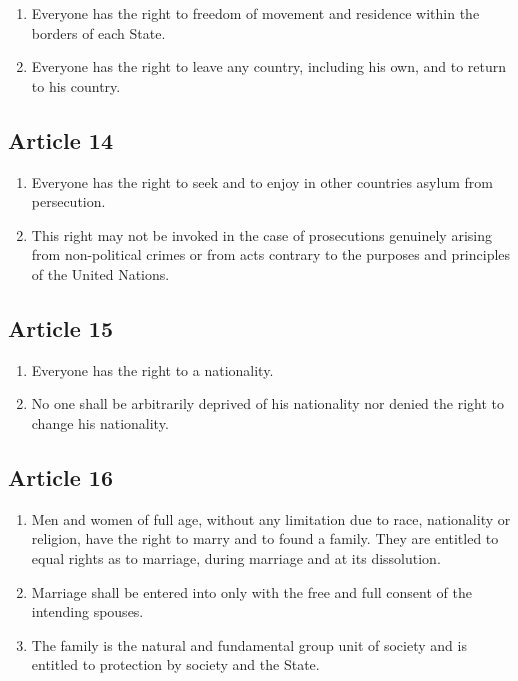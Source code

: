 \documentclass[
  ngerman,
  american,
  titlepage,
  openright,
  DIV=calc,
  toc=listof,
  listof=nochaptergap]{scrbook}
\begin{document}
\begin{enumerate}
\def\labelenumi{\arabic{enumi}.}
\item
  Everyone has the right to freedom of movement and residence within the
  borders of each State.
\item
  Everyone has the right to leave any country, including his own, and to
  return to his country.
\end{enumerate}

\subsection{Article 14}\label{article-14-3}

\begin{enumerate}
\def\labelenumi{\arabic{enumi}.}
\item
  Everyone has the right to seek and to enjoy in other countries asylum
  from persecution.
\item
  This right may not be invoked in the case of prosecutions genuinely
  arising from non-political crimes or from acts contrary to the
  purposes and principles of the United Nations.
\end{enumerate}

\subsection{Article 15}\label{article-15-3}

\begin{enumerate}
\def\labelenumi{\arabic{enumi}.}
\item
  Everyone has the right to a nationality.
\item
  No one shall be arbitrarily deprived of his nationality nor denied the
  right to change his nationality.
\end{enumerate}

\subsection{Article 16}\label{article-16-3}

\begin{enumerate}
\def\labelenumi{\arabic{enumi}.}
\item
  Men and women of full age, without any limitation due to race,
  nationality or religion, have the right to marry and to found a
  family. They are entitled to equal rights as to marriage, during
  marriage and at its dissolution.
\item
  Marriage shall be entered into only with the free and full consent of
  the intending spouses.
\item
  The family is the natural and fundamental group unit of society and is
  entitled to protection by society and the State.
\end{enumerate}
\end{document}
